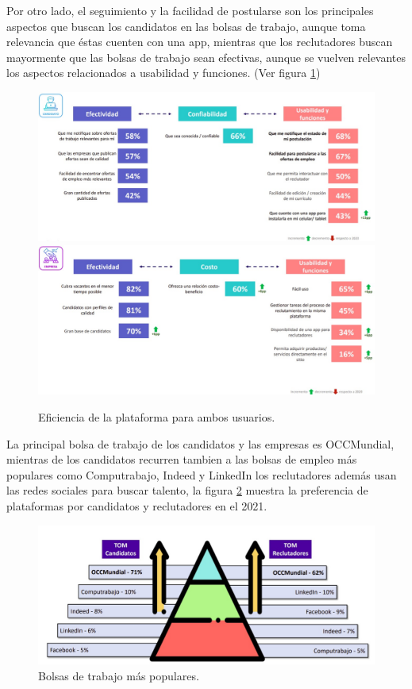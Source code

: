     Por otro lado, el seguimiento y la facilidad de postularse son los principales aspectos que buscan los candidatos en las bolsas 
    de trabajo, aunque toma relevancia que éstas cuenten con una app, mientras que los reclutadores buscan mayormente que las bolsas 
    de trabajo sean efectivas, aunque se vuelven relevantes los aspectos relacionados a usabilidad y funciones. \cite{AIMX}\cite{Evo} (Ver figura \ref{mark:efi})
    \begin{figure}[H]
        \begin{center}
            \includegraphics[width=.6\textwidth]{antecedentes/imagenes/prefC.jpeg}
            \includegraphics[width=.6\textwidth]{antecedentes/imagenes/prefE.jpeg}
        \end{center}
        \caption{Eficiencia de la plataforma para ambos usuarios.}
        \label{mark:efi}
    \end{figure}

    La principal bolsa de trabajo  de los candidatos y las empresas es OCCMundial, mientras de los candidatos recurren tambien a las 
bolsas de empleo más populares como Computrabajo, Indeed y LinkedIn los reclutadores además usan las redes sociales para buscar talento, la
figura \ref{mark:top} muestra la preferencia de plataformas por candidatos y reclutadores en el 2021.\cite{Evo}
\begin{figure}[H]
    \begin{center}
        \includegraphics[width=.7\textwidth]{antecedentes/imagenes/topbdt.jpeg}
    \end{center}
    \caption{Bolsas de trabajo más populares.}
    \label{mark:top}
\end{figure}


